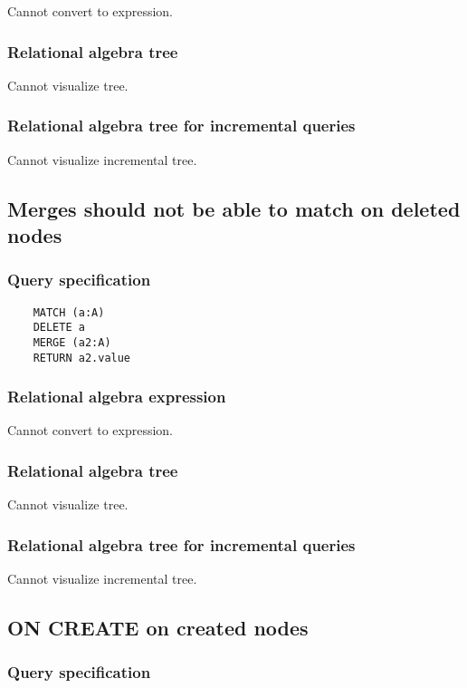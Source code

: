 	Cannot convert to expression.

	\subsubsection*{Relational algebra tree}

	Cannot visualize tree.

	\subsubsection*{Relational algebra tree for incremental queries}

	Cannot visualize incremental tree.
	\subsection{Merges should not be able to match on deleted nodes}

	\subsubsection*{Query specification}

	\begin{lstlisting}
	MATCH (a:A)
	DELETE a
	MERGE (a2:A)
	RETURN a2.value
	\end{lstlisting}


	\subsubsection*{Relational algebra expression}

	Cannot convert to expression.

	\subsubsection*{Relational algebra tree}

	Cannot visualize tree.

	\subsubsection*{Relational algebra tree for incremental queries}

	Cannot visualize incremental tree.
	\subsection{ON CREATE on created nodes}

	\subsubsection*{Query specification}

